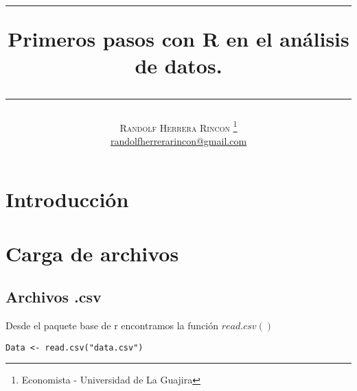 \documentclass[12pt,a4paper]{article}
\title{   \begin{center}\rule{0.9\textwidth}{0.1mm} \end{center}
    {\Huge\textbf{Primeros pasos con R en el análisis de datos.}}
    \begin{center}\rule{0.9\textwidth}{0.1mm} \end{center}
}
\author{\textsc{Randolf Herrera Rincon}
    \thanks{Economista - Universidad de La Guajira}\\
    \normalsize 
    \href{mailto:randolfherrerarincon@gmail.com}{randolfherrerarincon@gmail.com}   
}
\begin{document}
\maketitle
\tableofcontents
\newpage
\section{Introducción}
\newpage
\section{Carga de archivos}
\subsection{Archivos .csv}
Desde el paquete base de r encontramos la función $read.csv()$ \citep{baseR}
\begin{lstlisting}[style=Rstyle, caption={Lectura de datos en R}, label=lst:readcsv]
	Data <- read.csv("data.csv")
\end{lstlisting}
\newpage

     
\end{document}
